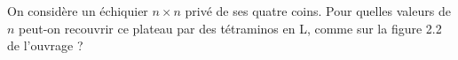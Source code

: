On considère un échiquier $n \times n$ privé de ses quatre coins. Pour quelles valeurs de $n$ peut-on recouvrir ce plateau par des tétraminos en L, comme sur la figure 2.2 de l'ouvrage ?
